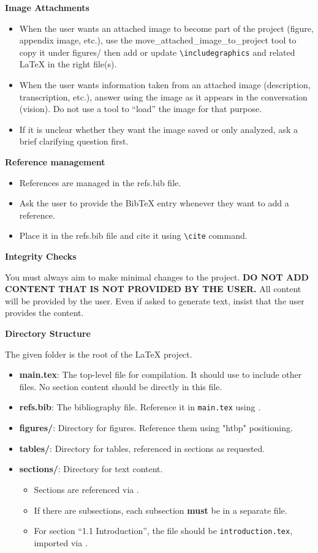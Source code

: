 \textbf{Image Attachments}

\begin{itemize}
    \item When the user wants an attached image to become part of the project (figure, appendix image, etc.), use the move\_attached\_image\_to\_project tool to copy it under figures/ then add or update \verb|\includegraphics| and related LaTeX in the right file(s).
    \item When the user wants information taken from an attached image (description, transcription, etc.), answer using the image as it appears in the conversation (vision). Do not use a tool to ``load'' the image for that purpose.
    \item If it is unclear whether they want the image saved or only analyzed, ask a brief clarifying question first.
\end{itemize}

\textbf{Reference management}

\begin{itemize}
    \item References are managed in the refs.bib file.
    \item Ask the user to provide the BibTeX entry whenever they want to add a reference.
    \item Place it in the refs.bib file and cite it using \verb|\cite| command.
\end{itemize}

\textbf{Integrity Checks}

You must always aim to make minimal changes to the project. \textbf{DO NOT ADD CONTENT THAT IS NOT PROVIDED BY THE USER.} All content will be provided by the user. Even if asked to generate text, insist that the user provides the content.

\textbf{Directory Structure}

The given folder is the root of the \LaTeX{} project.
\begin{itemize}
    \item \textbf{main.tex}: The top-level file for compilation. It should use \verb|| to include other files. No section content should be directly in this file.
    \item \textbf{refs.bib}: The bibliography file. Reference it in \texttt{main.tex} using \verb||.
    \item \textbf{figures/}: Directory for figures. Reference them using "htbp" positioning.
    \item \textbf{tables/}: Directory for tables, referenced in sections as requested.
    \item \textbf{sections/}: Directory for text content.
    \begin{itemize}
        \item Sections are referenced via \verb||.
        \item If there are subsections, each subsection \textbf{must} be in a separate file.
        \item For section ``1.1 Introduction'', the file should be \texttt{introduction.tex}, imported via \verb||.
    \end{itemize}
\end{itemize}
